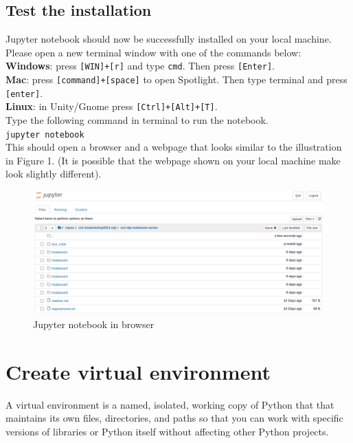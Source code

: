 \documentclass[12pt]{article}
\begin{document}
    \subsection{Test the installation}
    Jupyter notebook should now be successfully installed on your local machine. Please open a new terminal window with one of the commands below: \\

    \noindent \textbf{Windows}: press \verb|[WIN]+[r]| and type \verb|cmd|. Then press \verb|[Enter]|. \\
    \textbf{Mac}: press \verb|[command]+[space]| to open Spotlight. Then type terminal
    and press \verb|[enter]|. \\
    \textbf{Linux}: in Unity/Gnome press \verb|[Ctrl]+[Alt]+[T]|. \\
    
    \noindent Type the following command in terminal to run the notebook. \\
    
    \verb|jupyter notebook| \\
    
    \noindent This should open a browser and a webpage that looks similar to the illustration in Figure 1. (It is possible that the webpage shown on your local machine make look slightly different).
    
    \begin{figure}[H]
        \centering
        \includegraphics[width=\textwidth]{"img/pic.png"}
        \caption{Jupyter notebook in browser}
    \end{figure}
    
\section{Create virtual environment}
A virtual environment is a named, isolated, working copy of Python that that maintains its own files, directories, and paths so that you can work with specific versions of libraries or Python itself without affecting other Python projects.
\end{document}
